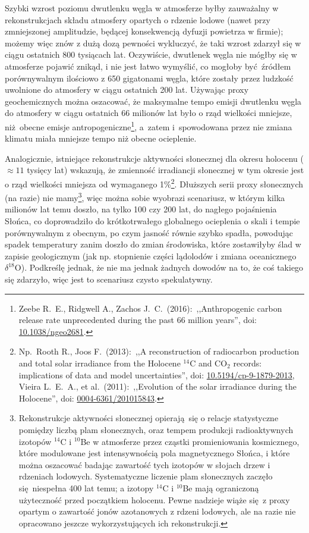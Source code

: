 \documentclass[12pt]{article}
\newcommand{\doi}[1]{doi: \href{htts://doi.org/#1}{#1}}
\begin{document}
Szybki wzrost poziomu dwutlenku węgla w atmosferze byłby zauważalny w rekonstrukcjach składu atmosfery opartych o rdzenie lodowe (nawet przy zmniejszonej amplitudzie, będącej konsekwencją dyfuzji powietrza w firmie); możemy więc znów z dużą dozą pewności wykluczyć, że taki wzrost zdarzył się w ciągu ostatnich 800 tysiącach lat. Oczywiście, dwutlenek węgla nie mógłby się w atmosferze pojawić znikąd, i nie jest łatwo wymyślić, co mogłoby być źródłem porównywalnym ilościowo z 650 gigatonami węgla, które zostały przez ludzkość uwolnione do atmosfery w ciągu ostatnich 200 lat. Używając proxy geochemicznych można oszacować, że maksymalne tempo emisji dwutlenku węgla do atmosfery w ciągu ostatnich 66 milionów lat było o rząd wielkości mniejsze, niż obecne emisje antropogeniczne\footnote{Zeebe R.~E., Ridgwell A., Zachos J.~C.~(2016):~,,Anthropogenic carbon release rate unprecedented during the past 66 million years'', \doi{10.1038/ngeo2681}.}, a~zatem i~spowodowana przez nie zmiana klimatu miała mniejsze tempo niż obecne ocieplenie.

Analogicznie, istniejące rekonstrukcje aktywności słonecznej dla okresu holocenu ($\approx11$ tysięcy lat) wskazują, że zmienność irradiancji słonecznej w tym okresie jest o rząd wielkości mniejsza od wymaganego 1\%\footnote{Np.~Rooth R., Joos F.~(2013):~,,A reconstruction of radiocarbon production and total solar irradiance from the Holocene $^{14}$C and CO$_2$ records: implications of data and model uncertainties'', \doi{10.5194/cp-9-1879-2013}, Vieira L.~E.~A., et al.~(2011):~,,Evolution of the solar irradiance during the Holocene'', \doi{0004-6361/201015843}.}. Dłuższych serii proxy słonecznych (na razie) nie mamy\footnote{Rekonstrukcje aktywności słonecznej opierają się o relacje statystyczne pomiędzy liczbą plam słonecznych, oraz tempem produkcji radioaktywnych izotopów $^{14}$C i $^{10}$Be w atmosferze przez cząstki promieniowania kosmicznego, które modulowane jest intensywnością pola magnetycznego Słońca, i które można oszacować badając zawartość tych izotopów w słojach drzew i rdzeniach lodowych. Systematyczne liczenie plam słonecznych zaczęło się niespełna 400 lat temu; a izotopy $^{14}$C i $^{10}$Be mają ograniczoną użyteczność przed początkiem holocenu. Pewne nadzieje wiąże się z proxy opartym o zawartość jonów azotanowych z rdzeni lodowych, ale na razie nie opracowano jeszcze wykorzystujących ich rekonstrukcji.}, więc można sobie wyobrazi scenariusz, w którym kilka milionów lat temu doszło, na tylko 100 czy 200 lat, do nagłego pojaśnienia Słońca, co doprowadziło do krótkotrwałego globalnego ocieplenia o skali i tempie porównywalnym z obecnym, po czym jasność równie szybko spadła, powodując spadek temperatury zanim doszło do zmian środowiska, które zostawiłyby ślad w zapisie geologicznym (jak np. stopnienie części lądolodów i zmiana oceanicznego $\delta^{18}$O). Podkreślę jednak, że nie ma jednak żadnych dowodów na to, że coś takiego się zdarzyło, więc jest to scenariusz czysto spekulatywny.
\end{document}

